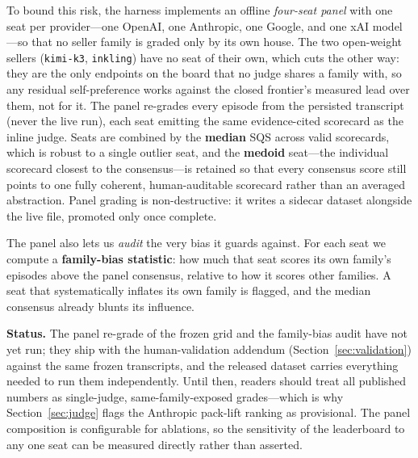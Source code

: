 To bound this risk, the harness implements an offline \emph{four-seat panel} with
one seat per provider---one OpenAI, one Anthropic, one Google, and one xAI
model---so that no seller family is graded only by its own house. The two
open-weight sellers (\texttt{kimi-k3}, \texttt{inkling}) have no seat of their
own, which cuts the other way: they are the only endpoints on the board that no
judge shares a family with, so any residual self-preference works against the
closed frontier's measured lead over them, not for it. The panel
re-grades every episode from the persisted transcript (never the live run), each
seat emitting the same evidence-cited scorecard as the inline judge. Seats are
combined by the \textbf{median} SQS across valid scorecards, which is robust to a
single outlier seat, and the \textbf{medoid} seat---the individual scorecard
closest to the consensus---is retained so that every consensus score still points
to one fully coherent, human-auditable scorecard rather than an averaged
abstraction. Panel grading is non-destructive: it writes a sidecar dataset
alongside the live file, promoted only once complete.

The panel also lets us \emph{audit} the very bias it guards against. For each seat
we compute a \textbf{family-bias statistic}: how much that seat scores its own
family's episodes above the panel consensus, relative to how it scores other
families. A seat that systematically inflates its own family is flagged, and the
median consensus already blunts its influence.

\textbf{Status.} The panel re-grade of the frozen grid and the family-bias audit
have not yet run; they ship with the human-validation addendum
(Section~\ref{sec:validation}) against the same frozen transcripts, and the
released dataset carries everything needed to run them independently. Until then,
readers should treat all published numbers as single-judge, same-family-exposed
grades---which is why Section~\ref{sec:judge} flags the Anthropic pack-lift
ranking as provisional. The panel composition is configurable for ablations, so
the sensitivity of the leaderboard to any one seat can be measured directly
rather than asserted.
